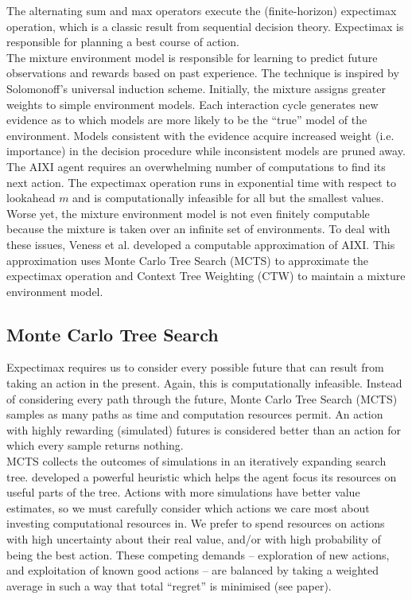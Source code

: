 \documentclass{article}
\theoremstyle{definition}
\newtheorem{primary statistics}[definition]{Primary Statistics}
\newtheorem{auxiliary statistics}[definition]{Auxiliary Statistics}
\begin{document}
The alternating sum and max operators execute the (finite-horizon) expectimax operation, which is a classic result from sequential decision theory. Expectimax is responsible for planning a best course of action. \\

The mixture environment model is responsible for learning to predict future observations and rewards based on past experience. The technique is inspired by Solomonoff’s universal induction scheme. Initially, the mixture assigns greater weights to simple environment models. Each interaction cycle generates new evidence as to which models are more likely to be the “true” model of the environment. Models consistent with the evidence acquire increased weight (i.e. importance) in the decision procedure while inconsistent models are pruned away. \\

The AIXI agent requires an overwhelming number of computations to find its next action. The expectimax operation runs in exponential time with respect to lookahead $m$ and is computationally infeasible for all but the smallest values. Worse yet, the mixture environment model is not even finitely computable because the mixture is taken over an infinite set of environments. To deal with these issues, Veness et al. developed a computable approximation of AIXI. This approximation uses Monte Carlo Tree Search (MCTS) to approximate the expectimax operation and Context Tree Weighting (CTW) to maintain a mixture environment model. 

\subsection{Monte Carlo Tree Search}
Expectimax requires us to consider every possible future that can result from taking an action in the present. Again, this is computationally infeasible. Instead of considering every path through the future, Monte Carlo Tree Search (MCTS) samples as many paths as time and computation resources permit. An action with highly rewarding (simulated) futures is considered better than an action for which every sample returns nothing. \\

MCTS collects the outcomes of simulations in an iteratively expanding search tree.  \citep{kocsis2006bandit} developed a powerful heuristic which helps the agent focus its resources on useful parts of the tree. Actions with more simulations have better value estimates, so we must carefully consider which actions we care most about investing computational resources in. We prefer to spend resources on actions with high uncertainty about their real value, and/or with high probability of being the best action. These competing demands -- exploration of new actions, and exploitation of known good actions -- are balanced by taking a weighted average in such a way that total “regret” is minimised (see paper). \\
\end{document}
